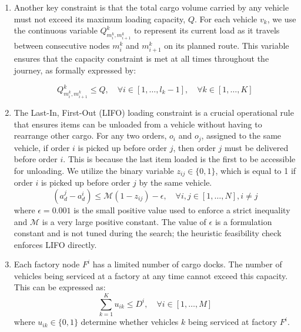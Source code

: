 \documentclass[pdflatex]{sn-jnl}
\begin{document}
\begin{enumerate}
\begin{equation}
     \text{demand}(o^i) = \sum_{h = 1}^{ \mathcal{H} ^i} \text{demand}(o^i_h)
\end{equation}

\begin{equation}
     0 < \text{demand}(o^i_h) \leq Q , \quad \forall h\in [1 , \dots , \mathcal{H}^i] , \quad \forall i \in [1, \dots , N] 
\end{equation}


    \item Another key constraint is that the total cargo volume carried by any vehicle must not exceed its maximum loading capacity, $Q$. For each vehicle $v_k$, we use the continuous variable $Q^k_{m_i^k , m_{i+1}^k}$ to represent its current load as it travels between consecutive nodes $m_i^k$ and $m_{i+1}^k$ on its planned route. This variable ensures that the capacity constraint is met at all times throughout the journey, as formally expressed by:

\begin{equation}
    Q^k_{m_i^k , m_{i +1}^k} \leq Q , \quad \forall i \in [1 , \dots , l_k - 1] , \quad \forall k \in [1, \dots , K]
\end{equation}

    \item The Last-In, First-Out (LIFO) loading constraint is a crucial operational rule that ensures items can be unloaded from a vehicle without having to rearrange other cargo. For any two orders, $o_i$ and $o_j$, assigned to the same vehicle, if order $i$ is picked up before order $j$, then order $j$ must be delivered before order $i$. This is because the last item loaded is the first to be accessible for unloading. We utilize the binary variable $z_{ij} \in \{0,1\}$, which is equal to 1 if order $i$ is picked up before order $j$ by the same vehicle. 
\begin{equation}
  (a_{d}^j - a_{d}^i) \leq \mathcal{M}(1 - z_{ij}) - \epsilon, \quad \forall i, j \in [1 , \dots , N], i \neq j   
\end{equation}
where $\epsilon=0.001$ is the small positive value used to enforce a strict inequality and $\mathcal{M}$ is a very large positive constant. The value of $\epsilon$ is a formulation constant and is not tuned during the search; the heuristic feasibility check enforces LIFO directly.

    \item Each factory node $F^i$ has a limited number of cargo docks. The number of vehicles being serviced at a factory at any time cannot exceed this capacity. This can be expressed as:
\begin{equation}
    \sum_{k = 1}^K u_{i k} \leq D^i, \quad \forall i \in [1 , \dots , M]
\end{equation}
where $ u_{i k} \in \{0 , 1\}$ determine whether vehicles $k$ being serviced at factory $F^i$.


\end{enumerate}
\end{document}
